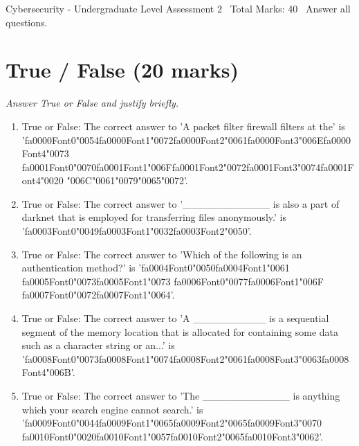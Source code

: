 \documentclass[12pt]{article}
\begin{document}
\begin{center}
Cybersecurity - Undergraduate Level Assessment 2 \
Total Marks: 40 \
Answer all questions.
\end{center}

\section*{True / False (20 marks)}
\textit{Answer True or False and justify briefly.}
\begin{enumerate}[label=\arabic*.]
\item True or False: The correct answer to 'A packet filter firewall filters at the' is '{\csname fa0000Font0\endcsname\char"0054}{\csname fa0000Font1\endcsname\char"0072}{\csname fa0000Font2\endcsname\char"0061}{\csname fa0000Font3\endcsname\char"006E}{\csname fa0000Font4\endcsname\char"0073} {\csname fa0001Font0\endcsname\char"0070}{\csname fa0001Font1\endcsname\char"006F}{\csname fa0001Font2\endcsname\char"0072}{\csname fa0001Font3\endcsname\char"0074}{\csname fa0001Font4\endcsname\char"0020} {\char"006C}{\char"0061}{\char"0079}{\char"0065}{\char"0072}'.
\item True or False: The correct answer to '\_\_\_\_\_\_\_\_\_\_\_\_ is also a part of darknet that is employed for transferring files anonymously.' is '{\csname fa0003Font0\endcsname\char"0049}{\csname fa0003Font1\endcsname\char"0032}{\csname fa0003Font2\endcsname\char"0050}'.
\item True or False: The correct answer to 'Which of the following is an authentication method?' is '{\csname fa0004Font0\endcsname\char"0050}{\csname fa0004Font1\endcsname\char"0061} {\csname fa0005Font0\endcsname\char"0073}{\csname fa0005Font1\endcsname\char"0073} {\csname fa0006Font0\endcsname\char"0077}{\csname fa0006Font1\endcsname\char"006F} {\csname fa0007Font0\endcsname\char"0072}{\csname fa0007Font1\endcsname\char"0064}'.
\item True or False: The correct answer to 'A \_\_\_\_\_\_\_\_\_\_ is a sequential segment of the memory location that is allocated for containing some data such as a character string or an...' is '{\csname fa0008Font0\endcsname\char"0073}{\csname fa0008Font1\endcsname\char"0074}{\csname fa0008Font2\endcsname\char"0061}{\csname fa0008Font3\endcsname\char"0063}{\csname fa0008Font4\endcsname\char"006B}'.
\item True or False: The correct answer to 'The \_\_\_\_\_\_\_\_\_\_\_\_ is anything which your search engine cannot search.' is '{\csname fa0009Font0\endcsname\char"0044}{\csname fa0009Font1\endcsname\char"0065}{\csname fa0009Font2\endcsname\char"0065}{\csname fa0009Font3\endcsname\char"0070} {\csname fa0010Font0\endcsname\char"0020}{\csname fa0010Font1\endcsname\char"0057}{\csname fa0010Font2\endcsname\char"0065}{\csname fa0010Font3\endcsname\char"0062}'.

\end{enumerate}
\end{document}
